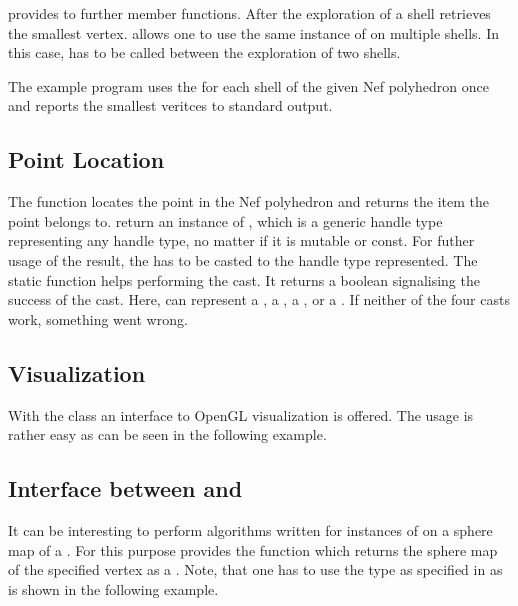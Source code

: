  provides to further member functions. After the exploration
of a shell  retrieves the smallest vertex.  allows one to use the same instance of 
  on multiple shells. In this case, 
has to be called between the exploration of two shells.

The example program uses the  for each shell of the given
Nef polyhedron once and reports the smallest veritces to standard output.

\subsection{Point Location}

The function  locates the point  in the 
Nef polyhedron and returns the item the point belongs to. 
return an instance of , which is a generic handle
type representing any handle type, no matter if it is mutable or const. 
For futher usage of the result, the  has to be casted 
to the handle type represented. The static \cgal function 
helps performing the cast. It returns a boolean signalising the success
of the cast. Here,  can represent a 
, a , 
a , or a . If neither of
the four casts work, something went wrong.


\subsection{Visualization}

With the class  an interface to OpenGL 
visualization is offered. The usage is rather easy as can be seen in the
following example.


\subsection{Interface between  and }

It can be interesting to perform algorithms written for instances of 
 on a sphere map of a . For this
purpose  provides the function 
 which returns the sphere map of
the specified vertex as a . Note, that one has to use
the type  as specified in  as 
is shown in the following example.


